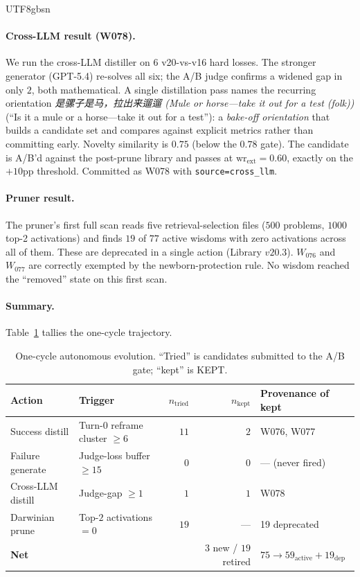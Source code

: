 \documentclass{article}
\begin{document}
\begin{CJK*}{UTF8}{gbsn}
\paragraph{Cross-LLM result (W078).} We run the cross-LLM distiller on
\(6\) v20-vs-v16 hard losses. The stronger generator (GPT-5.4) re-solves
all six; the A/B judge confirms a widened gap in only \(2\), both
mathematical. A single distillation pass names the recurring
orientation \emph{是骡子是马，拉出来遛遛 (\emph{Mule or horse—take it out for a test (folk)})} (``Is it a mule or a
horse—take it out for a test''): a \emph{bake-off orientation} that
builds a candidate set and compares against explicit metrics rather
than committing early. Novelty similarity is \(0.75\) (below the
\(0.78\) gate). The candidate is A/B'd against the
post-prune library and passes at \(\text{wr}_{\text{ext}} = 0.60\),
exactly on the \(+10\)pp threshold. Committed as W078 with
\texttt{source=cross\_llm}.

\paragraph{Pruner result.} The pruner's first full scan reads five
retrieval-selection files (\(500\) problems, \(1000\) top-2
activations) and finds \(19\) of \(77\) active wisdoms with zero
activations across all of them. These are deprecated in a single action
(Library \(v20.3\)). \(W_{076}\) and \(W_{077}\) are correctly
exempted by the newborn-protection rule. No wisdom reached the
``removed'' state on this first scan.

\paragraph{Summary.}
Table~\ref{tab:evolution} tallies the one-cycle trajectory.

\begin{table}[h]
  \centering
  \small
  \begin{tabular}{l l r r l}
    \toprule
    Action & Trigger & \(n_{\text{tried}}\) & \(n_{\text{kept}}\)
      & Provenance of kept \\
    \midrule
    Success distill & Turn-0 reframe cluster \(\geq 6\) & \(11\)
      & \(2\) & W076, W077 \\
    Failure generate & Judge-loss buffer \(\geq 15\) & \(0\)
      & \(0\) & --- (never fired) \\
    Cross-LLM distill & Judge-gap \(\geq 1\) & \(1\)\footnotemark
      & \(1\) & W078 \\
    Darwinian prune & Top-\(2\) activations \(= 0\) & \(19\)
      & --- & 19 deprecated \\
    \midrule
    \textbf{Net} & & & \(3\) new / \(19\) retired &
      \(75 \to 59_{\text{active}} + 19_{\text{dep}}\) \\
    \bottomrule
  \end{tabular}
  \caption{One-cycle autonomous evolution. ``Tried'' is candidates
    submitted to the A/B gate; ``kept'' is KEPT.}
  \label{tab:evolution}
\end{table}


\end{CJK*}
\end{document}
